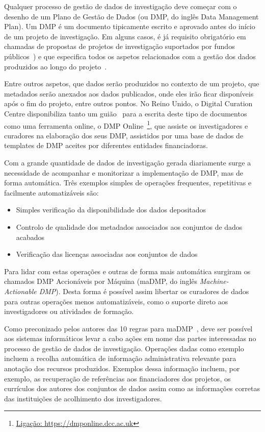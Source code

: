 \documentclass[sigconf,nonacm]{acmart}
\begin{document}
Qualquer processo de gestão de dados de investigação deve começar com o desenho de um Plano de Gestão de Dados (ou DMP, do inglês Data Management Plan). Um DMP é um documento tipicamente escrito e aprovado antes do início de um projeto de investigação. Em alguns casos, é já requisito obrigatório em chamadas de propostas de projetos de investigação suportados por fundos públicos~\cite{Foundation2011}) e que especifica todos os aspetos relacionados com a gestão dos dados produzidos ao longo do projeto~\cite{10.1371/journal.pcbi.1004525}.  

Entre outros aspetos, que dados serão produzidos no contexto de um projeto, que metadados serão anexados aos dados publicados, onde eles irão ficar disponíveis após o fim do projeto, entre outros pontos. No Reino Unido, o Digital Curation Centre disponibiliza tanto um guião~\cite{jones_dmp} para a escrita deste tipo de documentos como uma ferramenta online, o DMP Online~\footnote{\url{Ligação: https://dmponline.dcc.ac.uk}}, que assiste os investigadores e curadores na elaboração dos seus DMP, assistidos por uma base de dados de templates de DMP aceites por diferentes entidades financiadoras.

Com a grande quantidade de dados de investigação gerada diariamente surge a necessidade de acompanhar e monitorizar a implementação de DMP, mas de forma automática. Três exemplos simples de operações frequentes, repetitivas e facilmente automatizáveis são: 

\begin{itemize}
    \item Simples verificação da disponibilidade dos dados depositados
    \item Controlo de qualidade dos metadados associados aos conjuntos de dados acabados
    \item Verificação das licenças associadas aos conjuntos de dados
\end{itemize}

Para lidar com estas operações e outras de forma mais automática surgiram os chamados DMP Accionáveis por Máquina (maDMP, do inglês \textit{Machine-Actionable DMP}). Desta forma é possível assim libertar os curadores de dados para outras operações menos automatizáveis, como o suporte direto aos investigadores ou atividades de formação.

Como preconizado pelos autores das 10 regras para maDMP~\cite{miksa_tomasz_2018_1172673}, deve ser possível aos sistemas informáticos levar a cabo ações em nome das partes interessadas no processo de gestão de dados de investigação. Operações dadas como exemplo incluem a recolha automática de informação administrativa relevante para anotação dos recursos produzidos. Exemplos dessa informação incluem, por exemplo, as recuperação de referências aos financiadores dos projetos, os currículos dos autores dos conjuntos de dados assim como as informações corretas das instituições de acolhimento dos investigadores. 
\end{document}
